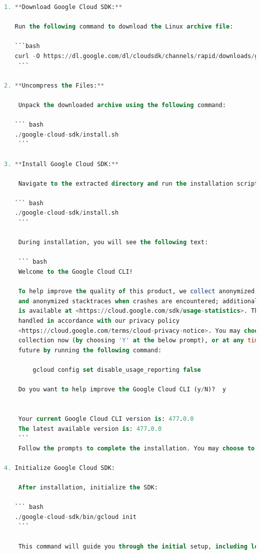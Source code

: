 \documentclass{article}
\begin{document}
\begin{lstlisting}[language=sql,caption={bash version}]
1. **Download Google Cloud SDK:**

   Run the following command to download the Linux archive file:

   ```bash
   curl -O https://dl.google.com/dl/cloudsdk/channels/rapid/downloads/google-cloud-cli-477.0.0-linux-x86_64.tar.gz
    ```

2. **Uncompress the Files:** 

    Unpack the downloaded archive using the following command:

   ``` bash
   ./google-cloud-sdk/install.sh
    ```

3. **Install Google Cloud SDK:**

    Navigate to the extracted directory and run the installation script:

   ``` bash
   ./google-cloud-sdk/install.sh
    ```

    During installation, you will see the following text:

    ``` bash
    Welcome to the Google Cloud CLI!

    To help improve the quality of this product, we collect anonymized usage data
    and anonymized stacktraces when crashes are encountered; additional information
    is available at <https://cloud.google.com/sdk/usage-statistics>. This data is
    handled in accordance with our privacy policy
    <https://cloud.google.com/terms/cloud-privacy-notice>. You may choose to opt in this
    collection now (by choosing 'Y' at the below prompt), or at any time in the
    future by running the following command:

        gcloud config set disable_usage_reporting false

    Do you want to help improve the Google Cloud CLI (y/N)?  y


    Your current Google Cloud CLI version is: 477.0.0
    The latest available version is: 477.0.0
    ```
    Follow the prompts to complete the installation. You may choose to opt-in or out of data collection.

4. Initialize Google Cloud SDK:

    After installation, initialize the SDK:

   ``` bash
   ./google-cloud-sdk/bin/gcloud init
    ```

    This command will guide you through the initial setup, including logging in with your Google account and selecting a Google Cloud project.


\end{lstlisting}
\end{document}
